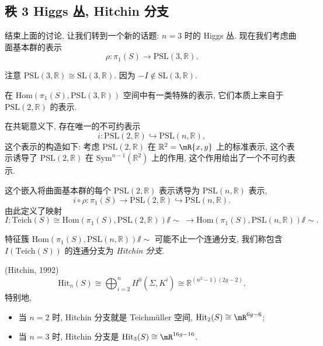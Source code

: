 \subsection{秩 3 Higgs 丛, Hitchin 分支}
结束上面的讨论, 让我们转到一个新的话题: $n=3$ 时的 Higgs 丛. 
现在我们考虑曲面基本群的表示
\begin{equation*}
    \rho: \pi_1(S)\to \mathrm{PSL}(3,\mathbb{R}).
\end{equation*}
\begin{remark}
    注意 $\mathrm{PSL}(3,\mathbb{R})\cong \mathrm{SL}(3,\mathbb{R})$. 因为 $-I\notin \mathrm{SL}(3,\mathbb{R})$. 
\end{remark}
在 $\mathrm{Hom}(\pi_1(S), \mathrm{PSL}(3,\mathbb{R}))$ 空间中有一类特殊的表示, 它们本质上来自于 $\mathrm{PSL}(2,\mathbb{R})$ 的表示. 
\begin{fact}
    在共轭意义下, 存在唯一的不可约表示
    \begin{equation*}
        i: \mathrm{PSL}(2,\mathbb{R})\hookrightarrow \mathrm{PSL}(n,\mathbb{R}),
    \end{equation*}
    这个表示的构造如下: 考虑 $\mathrm{PSL}(2,\mathbb{R})$ 在 $\mathbb{R}^2 = \mR\{x,y\}$ 上的标准表示, 
    这个表示诱导了 $\mathrm{PSL}(2,\mathbb{R})$ 在 $\mathrm{Sym}^{n-1}(\mathbb{R}^2)$ 上的作用, 
    这个作用给出了一个不可约表示.
\end{fact}
这个嵌入将曲面基本群的每个 $\mathrm{PSL}(2,\mathbb{R})$ 表示诱导为 $\mathrm{PSL}(n,\mathbb{R})$ 表示,
\begin{equation*}
    i\circ \rho: \pi_1(S)\to \mathrm{PSL}(2,\mathbb{R})\hookrightarrow \mathrm{PSL}(n,\mathbb{R}).
\end{equation*}
由此定义了映射
\begin{equation*}
    I:\mathrm{Teich}(S)\cong \mathrm{Hom}(\pi_1(S), \mathrm{PSL}(2,\mathbb{R}))\sslash\sim\;
    \longrightarrow \mathrm{Hom}(\pi_1(S), \mathrm{PSL}(n,\mathbb{R}))\sslash\sim.
\end{equation*}
\begin{definition}
    特征簇 $\mathrm{Hom}(\pi_1(S), \mathrm{PSL}(n,\mathbb{R}))\sslash\sim$ 可能不止一个连通分支, 
    我们称包含 $I(\mathrm{Teich}(S))$ 的连通分支为 \emph{Hitchin 分支}.
\end{definition}
\begin{theorem}(Hitchin, 1992)
    \begin{equation*}
        \mathrm{Hit}_n(S) \cong \bigoplus_{i=2}^n H^0(\Sigma, K^i)\cong \mathbb{R}^{(n^2-1)(2g-2)}.
    \end{equation*}
    特别地, 
    \begin{itemize}[leftmargin=*]
        \item 当 $n=2$ 时, Hitchin 分支就是 Teichm\"uller 空间, $\mathrm{Hit}_2(S)\cong\mR^{6g-6}$; 
        \item 当 $n=3$ 时, Hitchin 分支是 $\mathrm{Hit}_3(S)\cong\mR^{16g-16}$.
    \end{itemize}
\end{theorem}

